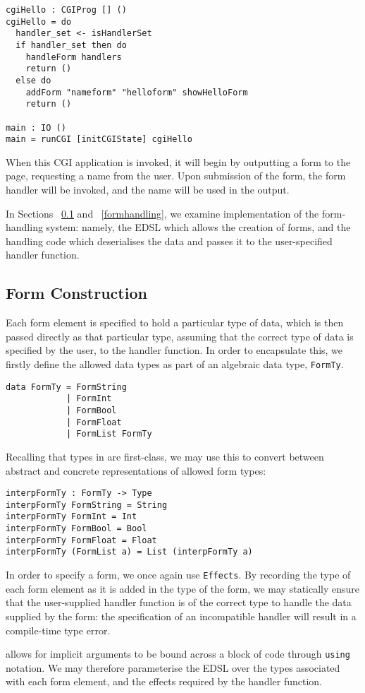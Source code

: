 \documentclass[preprint]{sigplanconf}
\begin{document}
\begin{Verbatim}
cgiHello : CGIProg [] ()
cgiHello = do
  handler_set <- isHandlerSet
  if handler_set then do
    handleForm handlers
    return ()
  else do
    addForm "nameform" "helloform" showHelloForm
    return ()

main : IO ()
main = runCGI [initCGIState] cgiHello
\end{Verbatim}
When this CGI application is invoked, it will begin by outputting a form to the page, requesting a name from the user. Upon submission of the form, the form handler will be invoked, and the name will be used in the output.

In Sections ~\ref{formcons} and ~\ref{formhandling}, we examine implementation of the form-handling system: namely, the EDSL which allows the creation of forms, and the handling code which deserialises the data and passes it to the user-specified handler function.
\subsection{Form Construction}
\label{formcons}
Each form element is specified to hold a particular type of data, which is then passed directly as that particular type, assuming that the correct type of data is specified by the user, to the handler function. In order to encapsulate this, we firstly define the allowed data types as part of an algebraic data type, \texttt{FormTy}.
\begin{Verbatim}
data FormTy = FormString
            | FormInt
            | FormBool
            | FormFloat
            | FormList FormTy 
\end{Verbatim}
Recalling that types in \idris{} are first-class, we may use this to convert between abstract and concrete representations of allowed form types:
\begin{Verbatim}
interpFormTy : FormTy -> Type
interpFormTy FormString = String
interpFormTy FormInt = Int
interpFormTy FormBool = Bool
interpFormTy FormFloat = Float
interpFormTy (FormList a) = List (interpFormTy a)
\end{Verbatim}
%
In order to specify a form, we once again use \texttt{Effects}. By recording the type of each form element as it is added in the type of the form, we may statically ensure that the user-supplied handler function is of the correct type to handle the data supplied by the form: the specification of an incompatible handler will result in a compile-time type error.

\idris{} allows for implicit arguments to be bound across a block of code through \texttt{using} notation. We may therefore parameterise the EDSL over the types associated with each form element, and the effects required by the handler function.
\end{document}
